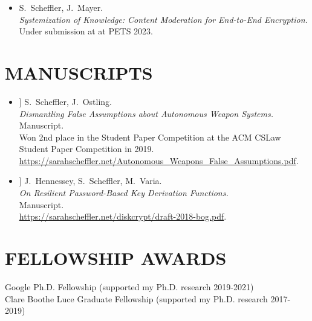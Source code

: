 \documentclass{res}
\begin{document}
\begin{resume}
\begin{itemize}
\item[\eeesok] S.~Scheffler, J.~Mayer. \\
\emph{Systemization of Knowledge: Content Moderation for End-to-End Encryption.} \\
Under submission at at PETS 2023.

\end{itemize}

\vspace{0.25in}

\section{MANUSCRIPTS}
\vspace{0.25in}

\newcommand{\autonomousWeapons}{[15]\xspace}
\newcommand{\bog}{[16]\xspace}

\begin{itemize}
\item[\autonomousWeapons] S.~Scheffler, J.~Ostling. \\
\emph{Dismantling False Assumptions about Autonomous Weapon Systems.} \\
Manuscript.  \\
Won 2nd place in the Student Paper Competition at the ACM CSLaw Student Paper Competition in 2019. \\
\url{https://sarahscheffler.net/Autonomous_Weapons_False_Assumptions.pdf}.

\item[\bog] J.~Hennessey, S.~Scheffler, M.~Varia. \\
\emph{On Resilient Password-Based Key Derivation Functions.} \\
Manuscript.  \\
\url{https://sarahscheffler.net/diskcrypt/draft-2018-bog.pdf}.
\end{itemize}

\vspace{0.25in}

\section{FELLOWSHIP AWARDS}
\vspace{0.1in}
    Google Ph.D. Fellowship (supported my Ph.D. research 2019-2021) \\
    Clare Boothe Luce Graduate Fellowship (supported my Ph.D. research 2017-2019) \\


\end{resume}
\end{document}
